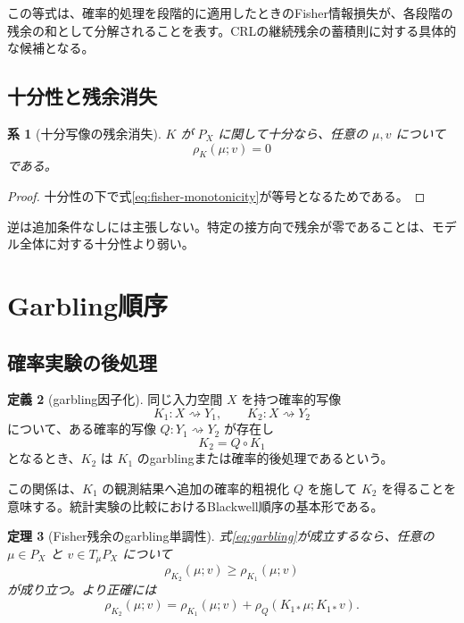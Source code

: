 \documentclass[a4paper,11pt]{ltjsarticle}
\theoremstyle{definition}
\newtheorem{definition}{定義}[section]
\theoremstyle{plain}
\newtheorem{theorem}[definition]{定理}
\newtheorem{corollary}[definition]{系}
\begin{document}
この等式は、確率的処理を段階的に適用したときのFisher情報損失が、各段階の残余の和として分解されることを表す。CRLの継続残余の蓄積則に対する具体的な候補となる。

\subsection{十分性と残余消失}

\begin{corollary}[十分写像の残余消失]
$K$ が $P_X$ に関して十分なら、任意の $\mu,v$ について
\begin{equation}
 \rho_K(\mu;v)=0
\end{equation}
である。
\end{corollary}

\begin{proof}
十分性の下で式\eqref{eq:fisher-monotonicity}が等号となるためである。
\end{proof}

逆は追加条件なしには主張しない。特定の接方向で残余が零であることは、モデル全体に対する十分性より弱い。

\section{Garbling順序}

\subsection{確率実験の後処理}

\begin{definition}[garbling因子化]
同じ入力空間 $X$ を持つ確率的写像
\begin{equation}
 K_1:X\rightsquigarrow Y_1,
 \qquad
 K_2:X\rightsquigarrow Y_2
\end{equation}
について、ある確率的写像 $Q:Y_1\rightsquigarrow Y_2$ が存在し
\begin{equation}
 K_2=Q\circ K_1
 \label{eq:garbling}
\end{equation}
となるとき、$K_2$ は $K_1$ のgarblingまたは確率的後処理であるという。
\end{definition}

この関係は、$K_1$ の観測結果へ追加の確率的粗視化 $Q$ を施して $K_2$ を得ることを意味する。統計実験の比較におけるBlackwell順序の基本形である\cite{Blackwell1953}。

\begin{theorem}[Fisher残余のgarbling単調性]
式\eqref{eq:garbling}が成立するなら、任意の $\mu\in P_X$ と $v\in T_\mu P_X$ について
\begin{equation}
 \rho_{K_2}(\mu;v)
 \geq
 \rho_{K_1}(\mu;v)
 \label{eq:garbling-residual}
\end{equation}
が成り立つ。より正確には
\begin{equation}
 \rho_{K_2}(\mu;v)
 =
 \rho_{K_1}(\mu;v)
 +
 \rho_Q(K_{1*}\mu;K_{1*}v).
 \label{eq:garbling-decomposition}
\end{equation}
\end{theorem}
\end{document}
